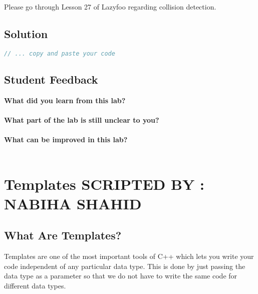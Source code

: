 \documentclass[11pt,fleqn]{book} %
\begin{document}
\begin{tcolorbox}[width=\textwidth,colback={white},title={KEYNOTE},colbacktitle=purple!50!white,coltitle=black] 
  Please go through Lesson 27 of Lazyfoo regarding collision detection.
\end{tcolorbox}

\newpage
\section{Solution}
\begin{lstlisting}[language=C++]
  // ... copy and paste your code
\end{lstlisting}

\newpage
\section{Student Feedback}
\textbf{What did you learn from this lab?}\\
\noindent\fbox{\parbox{\textwidth}{
  }
}\\
\textbf{What part of the lab is still unclear to you?}\\
\noindent\fbox{\parbox{\textwidth}{
  }
}\\
\textbf{What can be improved in this lab?}\\ 
\noindent\fbox{\parbox{\textwidth}{
  }
}\\

\newpage
{} %
\chapter{Templates \hspace{65mm} {\textsc{\small SCRIPTED BY : NABIHA SHAHID}}}

\section{What Are Templates?}

Templates are one of the most important tools of C++ which lets you write your code independent of any particular data type. This is done by just passing the data type as a parameter so that we do not have to write the same code for different data types.
\end{document}
